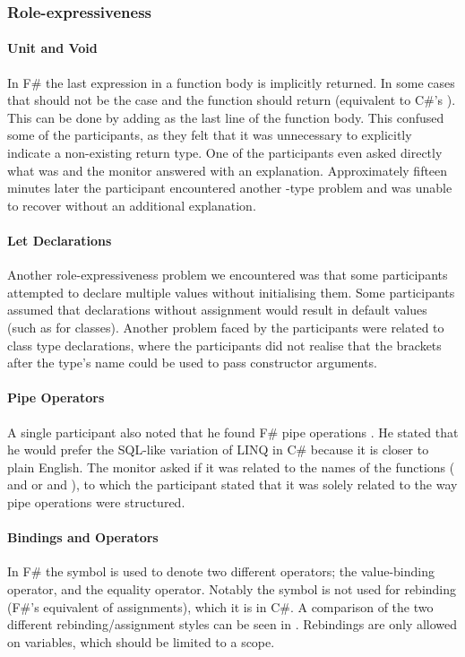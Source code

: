 \subsubsection{Role-expressiveness}
\paragraph{Unit and Void}
In F\# the last expression in a function body is implicitly returned. In some cases that should not be the case and the function should return  (equivalent to C\#'s ). This can be done by adding \ttt{()} as the last line of the function body. This confused some of the participants, as they felt that it was unnecessary to explicitly indicate a non-existing return type. One of the participants even asked directly what  was and the monitor answered with an explanation. Approximately fifteen minutes later the participant encountered another -type problem and was unable to recover without an additional explanation.

\paragraph{Let Declarations}
Another role-expressiveness problem we encountered was that some participants attempted to  declare multiple values without initialising them. Some participants assumed that  declarations without assignment would result in default values (such as  for classes). Another problem faced by the participants were related to class type declarations, where the participants did not realise that the brackets after the type's name could be used to pass constructor arguments.

\paragraph{Pipe Operators}
A single participant also noted that he found F\# pipe operations \textit{}. He stated that he would prefer the SQL-like variation of \gls{LINQ} in C\# because it is closer to plain English. The monitor asked if it was related to the names of the functions ( and  or  and ), to which the participant stated that it was solely related to the way pipe operations were structured.

\paragraph{Bindings and Operators}
In F\# the \ttt{=} symbol is used to denote two different operators; the value-binding operator, and the equality operator. Notably the symbol is not used for rebinding (F\#'s equivalent of assignments), which it is in C\#. A comparison of the two different rebinding/assignment styles can be seen in . Rebindings are only allowed on  variables, which should be limited to a scope.

